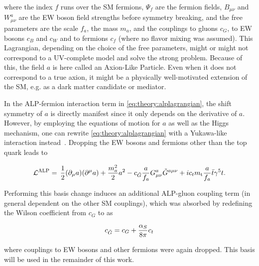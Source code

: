 \noindent where the index $f$ runs over the SM fermions, $\Psi_f$ are the fermion fields, $B_{\mu \nu}$ and $W^{a}_{\mu \nu}$ are the EW boson field strengths before symmetry breaking, and the free parameters are the scale $f_a$, the mass $m_a$, and the couplings to gluons $c_G$, to EW bosons $c_B$ and $c_W$ and to fermions $c_f$ (where no flavor mixing was assumed). This Lagrangian, depending on the choice of the free parameters, might or might not correspond to a UV-complete model and solve the strong \CP problem. Because of this, the field $a$ is here called an Axion-Like Particle. Even when it does not correspond to a true axion, it might be a physically well-motivated extension of the SM, e.g. as a dark matter candidate or mediator.

In the ALP-fermion interaction term in \cref{eq:theory:alplagrangian}, the shift symmetry of $a$ is directly manifest since it only depends on the derivative of $a$. However, by employing the equations of motion for $a$ as well as the Higgs mechanism, one can rewrite \cref{eq:theory:alplagrangian} with a Yukawa-like interaction instead~\cite{Brivio:2017ije,Bauer:2020jbp,Bonnefoy:2022rik}. Dropping the EW bosons and fermions other than the top quark leads to

\begin{equation}
\label{eq:theory:alplagrangian2}
    \mathcal{L}^{\mathrm{ALP}} = \, \frac{1}{2} (\partial_\mu a) (\partial^\mu a)
    + \frac{m_a^2}{2} a^2
    - c_{\tilde{G}} \frac{a}{f_a} G^{a}_{\mu \nu} \tilde{G}^{a \mu \nu}
    + i c_t m_{\mathrm{t}} \frac{a}{f_a} \bar{t} \gamma^5 t .
\end{equation}

Performing this basis change induces an additional ALP-gluon coupling term (in general dependent on the other SM couplings), which was absorbed by redefining the Wilson coefficient from $c_G$ to \cG as~\cite{Bauer:2020jbp,Jeppe:2024sxt}

\begin{equation}
  c_{\tilde{G}} = c_G + \frac{\alpha_S}{8 \pi} c_t
\end{equation}

\noindent where couplings to EW bosons and other fermions were again dropped. This basis will be used in the remainder of this work. 

